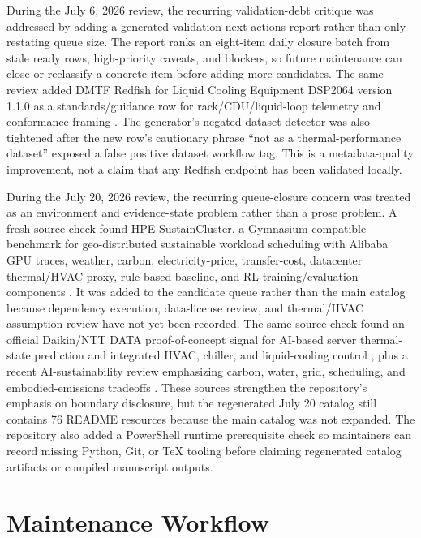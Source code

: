 \documentclass[11pt]{article}
\begin{document}
During the July 6, 2026 review, the recurring validation-debt critique was addressed by adding a generated validation next-actions report rather than only restating queue size. The report ranks an eight-item daily closure batch from stale ready rows, high-priority caveats, and blockers, so future maintenance can close or reclassify a concrete item before adding more candidates. The same review added DMTF Redfish for Liquid Cooling Equipment DSP2064 version 1.1.0 as a standards/guidance row for rack/CDU/liquid-loop telemetry and conformance framing \cite{DMTFRedfishLiquidCooling2025}. The generator's negated-dataset detector was also tightened after the new row's cautionary phrase ``not as a thermal-performance dataset'' exposed a false positive dataset workflow tag. This is a metadata-quality improvement, not a claim that any Redfish endpoint has been validated locally.

During the July 20, 2026 review, the recurring queue-closure concern was treated as an environment and evidence-state problem rather than a prose problem. A fresh source check found HPE SustainCluster, a Gymnasium-compatible benchmark for geo-distributed sustainable workload scheduling with Alibaba GPU traces, weather, carbon, electricity-price, transfer-cost, datacenter thermal/HVAC proxy, rule-based baseline, and RL training/evaluation components \cite{HPESustainCluster2026}. It was added to the candidate queue rather than the main catalog because dependency execution, data-license review, and thermal/HVAC assumption review have not yet been recorded. The same source check found an official Daikin/NTT DATA proof-of-concept signal for AI-based server thermal-state prediction and integrated HVAC, chiller, and liquid-cooling control \cite{DaikinNTTDataCoolingPoC2026}, plus a recent AI-sustainability review emphasizing carbon, water, grid, scheduling, and embodied-emissions tradeoffs \cite{ChienAISustainability2026}. These sources strengthen the repository's emphasis on boundary disclosure, but the regenerated July 20 catalog still contains 76 README resources because the main catalog was not expanded. The repository also added a PowerShell runtime prerequisite check so maintainers can record missing Python, Git, or TeX tooling before claiming regenerated catalog artifacts or compiled manuscript outputs.

\section{Maintenance Workflow}
\end{document}
